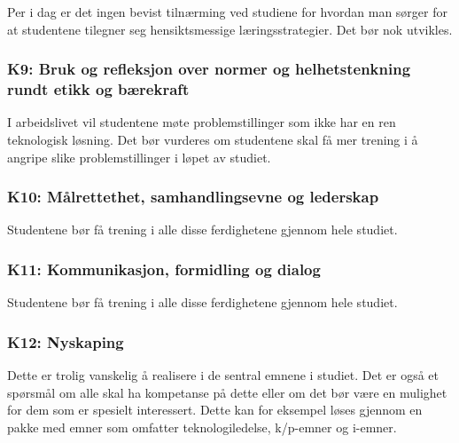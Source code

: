 Per i dag er det ingen bevist tilnærming ved studiene for hvordan man sørger for at studentene tilegner seg hensiktsmessige læringsstrategier. Det bør nok utvikles.

\subsubsection{K9: Bruk og refleksjon over normer og helhetstenkning rundt etikk og bærekraft} 
I arbeidslivet vil studentene møte problemstillinger som ikke har en ren teknologisk løsning. Det bør vurderes om studentene skal få mer trening i å angripe slike problemstillinger i løpet av studiet.

\subsubsection{K10: Målrettethet, samhandlingsevne og lederskap}

Studentene bør få trening i alle disse ferdighetene gjennom hele studiet.

\subsubsection{K11: Kommunikasjon, formidling og dialog}

Studentene bør få trening i alle disse ferdighetene gjennom hele studiet.

\subsubsection{K12: Nyskaping}

Dette er trolig vanskelig å realisere i de sentral emnene i studiet. Det er også et spørsmål om alle skal ha kompetanse på dette eller om det bør være en mulighet for dem som er spesielt interessert. Dette kan for eksempel løses gjennom en pakke med emner som omfatter teknologiledelse, k/p-emner og i-emner.
